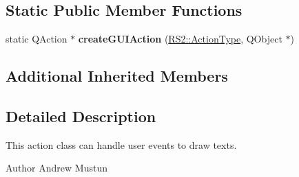 \subsection*{Static Public Member Functions}
\begin{DoxyCompactItemize}
\item 
\hypertarget{classRS__ActionDrawMText_aa39f2a0e7f6a26596bf3014d179eb0a6}{static Q\-Action $\ast$ {\bfseries create\-G\-U\-I\-Action} (\hyperlink{classRS2_afe3523e0bc41fd637b892321cfc4b9d7}{R\-S2\-::\-Action\-Type}, Q\-Object $\ast$)}\label{classRS__ActionDrawMText_aa39f2a0e7f6a26596bf3014d179eb0a6}

\end{DoxyCompactItemize}
\subsection*{Additional Inherited Members}


\subsection{Detailed Description}
This action class can handle user events to draw texts.

\begin{DoxyAuthor}{Author}
Andrew Mustun 
\end{DoxyAuthor}


